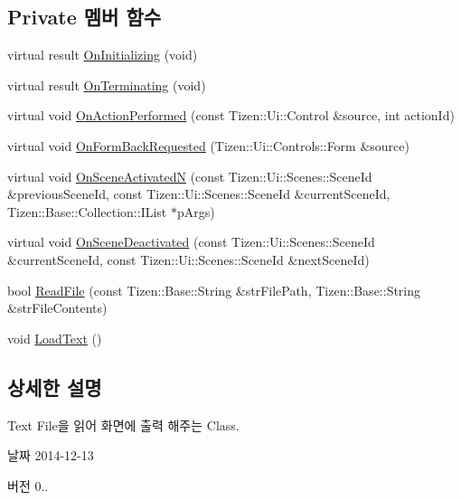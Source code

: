 \subsection*{Private 멤버 함수}
\begin{DoxyCompactItemize}
\item 
virtual result \hyperlink{class_text_viewer_form_a1174b7f39c5eaf5bc70598c54df20fb4}{On\+Initializing} (void)
\item 
virtual result \hyperlink{class_text_viewer_form_a152bcf154536f98c405bc8f35f545ca6}{On\+Terminating} (void)
\item 
virtual void \hyperlink{class_text_viewer_form_ae70d1e122343faa59719d604d1ae12b0}{On\+Action\+Performed} (const Tizen\+::\+Ui\+::\+Control \&source, int action\+Id)
\item 
virtual void \hyperlink{class_text_viewer_form_a1e6b94e7f974811b9ecc45dc6a7893ca}{On\+Form\+Back\+Requested} (Tizen\+::\+Ui\+::\+Controls\+::\+Form \&source)
\item 
virtual void \hyperlink{class_text_viewer_form_a71299da85593d79746ce82dae99b56d3}{On\+Scene\+Activated\+N} (const Tizen\+::\+Ui\+::\+Scenes\+::\+Scene\+Id \&previous\+Scene\+Id, const Tizen\+::\+Ui\+::\+Scenes\+::\+Scene\+Id \&current\+Scene\+Id, Tizen\+::\+Base\+::\+Collection\+::\+I\+List $\ast$p\+Args)
\item 
virtual void \hyperlink{class_text_viewer_form_af70565ab8d8365244043d0b9e390026b}{On\+Scene\+Deactivated} (const Tizen\+::\+Ui\+::\+Scenes\+::\+Scene\+Id \&current\+Scene\+Id, const Tizen\+::\+Ui\+::\+Scenes\+::\+Scene\+Id \&next\+Scene\+Id)
\item 
bool \hyperlink{class_text_viewer_form_a29ab38eb99aee639cd6a9d3f1d2aa6dd}{Read\+File} (const Tizen\+::\+Base\+::\+String \&str\+File\+Path, Tizen\+::\+Base\+::\+String \&str\+File\+Contents)
\item 
void \hyperlink{class_text_viewer_form_a42a0c06dc751be74e60b62406d44b90d}{Load\+Text} ()
\end{DoxyCompactItemize}


\subsection{상세한 설명}
Text File을 읽어 화면에 출력 해주는 Class. 

\begin{DoxyDate}{날짜}
2014-\/12-\/13 
\end{DoxyDate}
\begin{DoxyVersion}{버전}
0.. 
\end{DoxyVersion}


